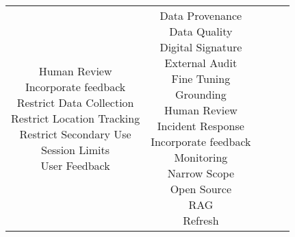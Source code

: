 \documentclass[fleqn]{article}
\begin{document}
\begin{landscape}
\begin{table}[H]
\begin{tabular}{|c|c|c|c|c|}
{			\textbullet\hspace{3pt} Human Review \\ 
			\textbullet\hspace{3pt} Incorporate feedback \\ 
			\textbullet\hspace{3pt} Restrict Data Collection\\ 		
			\textbullet\hspace{3pt} Restrict Location Tracking\\ 	
			\textbullet\hspace{3pt} Restrict Secondary Use\\ 		
			\textbullet\hspace{3pt} Session Limits\\ 	
			\textbullet\hspace{3pt} User Feedback\\ 						 	 
		}
		& \makecell[l]{
			\textbullet\hspace{3pt} Data Provenance\\ 	
			\textbullet\hspace{3pt} Data Quality\\ 	
			\textbullet\hspace{3pt} Digital Signature\\ 	
			\textbullet\hspace{3pt} External Audit\\ 
			\textbullet\hspace{3pt} Fine Tuning\\ 	
			\textbullet\hspace{3pt} Grounding\\ 	
			\textbullet\hspace{3pt} Human Review \\ 	
			\textbullet\hspace{3pt} Incident Response\\ 	
			\textbullet\hspace{3pt} Incorporate feedback \\ 
			\textbullet\hspace{3pt} Monitoring\\ 	
			\textbullet\hspace{3pt} Narrow Scope\\ 	
			\textbullet\hspace{3pt} Open Source\\ 	
			\textbullet\hspace{3pt} RAG\\ 	
			\textbullet\hspace{3pt} Refresh\\ 	
}
\end{tabular}
\end{table}
\end{landscape}
\end{document}
